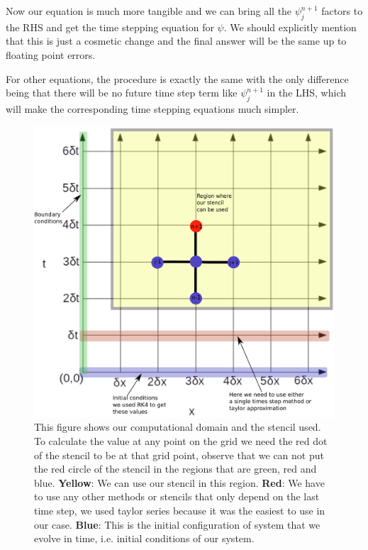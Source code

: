Now our equation is much more tangible and we can bring all the $\psi^{n+1}_j$ factors to the RHS and get the time stepping equation for $\psi$. We should explicitly mention that this is just a cosmetic change and the final answer will be the same up to floating point errors.

For other equations, the procedure is exactly the same with the only difference being that there will be no future time step term like $\psi^{n+1}_j$ in the LHS, which will make the corresponding time stepping equations much simpler.


\begin{figure}[hbt!]
    \centering
    \includegraphics[width=\textwidth]{images/labelled_grid.eps}
    \caption[Stencil used and the computational grid]{This figure shows our computational domain and the stencil used. To calculate the value at any point on the grid we need the red dot of the stencil to be at that grid point, observe that we can not put the red circle of the stencil in the regions that are green, red and blue. \textbf{Yellow}: We can use our stencil in this region. \textbf{Red}: We have to use any other methods or stencils that only depend on the last time step, we used taylor series because it was the easiest to use in our case. \textbf{Blue}: This is the initial configuration of system that we evolve in time, i.e. initial conditions of our system.}
    \label{fig:grid_with_stencil_and_regions}
\end{figure}



